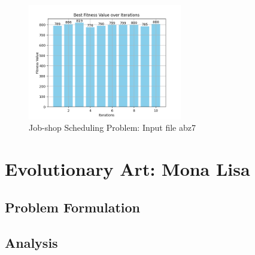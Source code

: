 \documentclass[12pt]{article}
\begin{document}
\begin{figure}[h]
    \centering
    \includegraphics[width=0.6\textwidth]{images/abz7_rntr1000-200-500-0.45-10.png}
    \caption{Job-shop Scheduling Problem: Input file abz7}
\end{figure}

\section{Evolutionary Art: Mona Lisa}

\subsection{Problem Formulation}



\subsection{Analysis}
\end{document}
